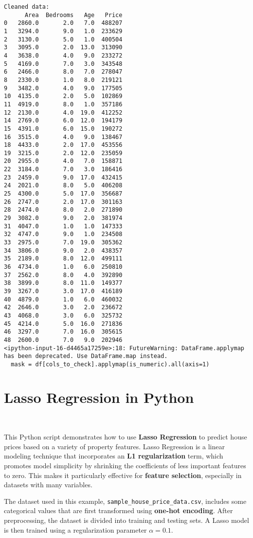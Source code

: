 \documentclass[12pt, a4paper]{report}
\begin{document}
\begin{lstlisting}[style=pythonstyle]
Cleaned data:
      Area  Bedrooms   Age   Price
0   2860.0       2.0   7.0  488207
1   3294.0       9.0   1.0  233629
2   3130.0       5.0   1.0  400504
3   3095.0       2.0  13.0  313090
4   3638.0       4.0   9.0  233272
5   4169.0       7.0   3.0  343548
6   2466.0       8.0   7.0  278047
8   2330.0       1.0   8.0  219121
9   3482.0       4.0   9.0  177505
10  4135.0       2.0   5.0  102869
11  4919.0       8.0   1.0  357186
12  2130.0       4.0  19.0  412252
14  2769.0       6.0  12.0  194179
15  4391.0       6.0  15.0  190272
16  3515.0       4.0   9.0  138467
18  4433.0       2.0  17.0  453556
19  3215.0       2.0  12.0  235059
20  2955.0       4.0   7.0  158871
22  3184.0       7.0   3.0  186416
23  2459.0       9.0  17.0  432415
24  2021.0       8.0   5.0  406208
25  4300.0       5.0  17.0  356687
26  2747.0       2.0  17.0  301163
28  2474.0       8.0   2.0  271890
29  3082.0       9.0   2.0  381974
31  4047.0       1.0   1.0  147333
32  4747.0       9.0   1.0  234508
33  2975.0       7.0  19.0  305362
34  3806.0       9.0   2.0  438357
35  2189.0       8.0  12.0  499111
36  4734.0       1.0   6.0  250810
37  2562.0       8.0   4.0  392890
38  3899.0       8.0  11.0  149377
39  3267.0       3.0  17.0  416189
40  4879.0       1.0   6.0  460032
42  2646.0       3.0   2.0  236672
43  4068.0       3.0   6.0  325732
45  4214.0       5.0  16.0  271836
46  3297.0       7.0  16.0  305615
48  2600.0       7.0   9.0  202946
<ipython-input-16-d4465a17259e>:18: FutureWarning: DataFrame.applymap has been deprecated. Use DataFrame.map instead.
  mask = df[cols_to_check].applymap(is_numeric).all(axis=1)
\end{lstlisting}
\newpage
\section{Lasso Regression in Python}\

This Python script demonstrates how to use \textbf{Lasso Regression} to predict house prices based on a variety of property features. Lasso Regression is a linear modeling technique that incorporates an \textbf{L1 regularization} term, which promotes model simplicity by shrinking the coefficients of less important features to zero. This makes it particularly effective for \textbf{feature selection}, especially in datasets with many variables.

The dataset used in this example, \texttt{sample\_house\_price\_data.csv}, includes some categorical values that are first transformed using \textbf{one-hot encoding}. After preprocessing, the dataset is divided into training and testing sets. A Lasso model is then trained using a regularization parameter $\alpha = 0.1$.
\end{document}
